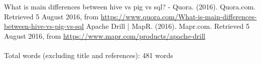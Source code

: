 \begin{thebibliography}{1}
What is main differences between hive vs pig vs sql? - Quora. (2016). Quora.com. Retrieved 5 August 2016, from \url{https://www.quora.com/What-is-main-differences-between-hive-vs-pig-vs-sql}
Apache Drill | MapR. (2016). Mapr.com. Retrieved 5 August 2016, from \url{https://www.mapr.com/products/apache-drill}

\end{thebibliography}

\paragraph{} Total words (excluding title and references): 481 words













